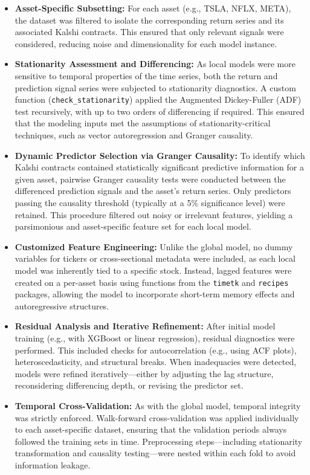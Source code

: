 \documentclass[12pt]{report}
\begin{document}
\begin{itemize}
    \item \textbf{Asset-Specific Subsetting:} For each asset (e.g., TSLA, NFLX, META), the dataset was filtered to isolate the corresponding return series and its associated Kalshi contracts. This ensured that only relevant signals were considered, reducing noise and dimensionality for each model instance.

    \item \textbf{Stationarity Assessment and Differencing:} 
    As local models were more sensitive to temporal properties of the time series, both the return and prediction signal series were subjected to stationarity diagnostics. A custom function (\texttt{check\_stationarity}) applied the Augmented Dickey-Fuller (ADF) test recursively, with up to two orders of differencing if required. This ensured that the modeling inputs met the assumptions of stationarity-critical techniques, such as vector autoregression and Granger causality.

    \item \textbf{Dynamic Predictor Selection via Granger Causality:}
    To identify which Kalshi contracts contained statistically significant predictive information for a given asset, pairwise Granger causality tests were conducted between the differenced prediction signals and the asset’s return series. Only predictors passing the causality threshold (typically at a 5\% significance level) were retained. This procedure filtered out noisy or irrelevant features, yielding a parsimonious and asset-specific feature set for each local model.

    \item \textbf{Customized Feature Engineering:}
    Unlike the global model, no dummy variables for tickers or cross-sectional metadata were included, as each local model was inherently tied to a specific stock. Instead, lagged features were created on a per-asset basis using functions from the \texttt{timetk} and \texttt{recipes} packages, allowing the model to incorporate short-term memory effects and autoregressive structures.

    \item \textbf{Residual Analysis and Iterative Refinement:}
    After initial model training (e.g., with XGBoost or linear regression), residual diagnostics were performed. This included checks for autocorrelation (e.g., using ACF plots), heteroscedasticity, and structural breaks. When inadequacies were detected, models were refined iteratively—either by adjusting the lag structure, reconsidering differencing depth, or revising the predictor set.

    \item \textbf{Temporal Cross-Validation:}
    As with the global model, temporal integrity was strictly enforced. Walk-forward cross-validation was applied individually to each asset-specific dataset, ensuring that the validation periods always followed the training sets in time. Preprocessing steps—including stationarity transformation and causality testing—were nested within each fold to avoid information leakage.
\end{itemize}
\end{document}

